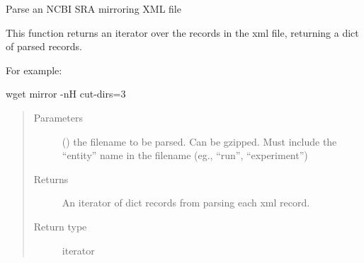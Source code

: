 \documentclass[letterpaper,10pt,english]{sphinxmanual}
\begin{document}
\begin{fulllineitems}
\label{\detokenize{omicidx.sra_parsers:omicidx.sra_parsers.parse_xml_file}}
Parse an NCBI SRA mirroring XML file

This function returns an iterator over the
records in the xml file, returning a dict
of parsed records.

For example:

wget \textendash{}mirror -nH \textendash{}cut-dirs=3 

\begin{sphinxVerbatim}[commandchars=\\\{\}]
   
  
\end{sphinxVerbatim}
\begin{quote}\begin{description}
\item[{Parameters}] \leavevmode
{} () \textendash{} the filename to be parsed. Can be gzipped. Must include
the “entity” name in the filename (eg., “run”, “experiment”)

\item[{Returns}] \leavevmode
An iterator of dict records from parsing each xml record.

\item[{Return type}] \leavevmode
iterator

\end{description}\end{quote}

\end{fulllineitems}

\end{document}
